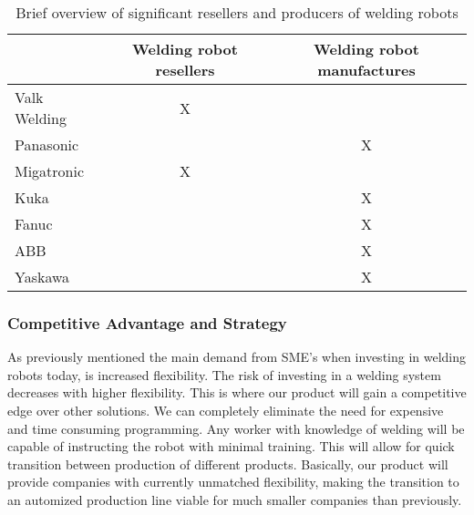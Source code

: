 \begin{table}[h]
\centering
\begin{tabular}{|l|c|c|}
\hline
             & Welding robot resellers & Welding robot manufactures \\ 
\hline
Valk Welding & X                       &  \\ 
\hline
Panasonic    &                         & X \\ 
\hline
Migatronic   & X                       &  \\ 
\hline
Kuka         &                         & X \\ 
\hline                                 
Fanuc        &                         & X \\ 
\hline                                 
ABB          &                         & X \\ 
\hline                                 
Yaskawa      &                         & X \\ 
\hline
\end{tabular} 
\caption{Brief overview of significant resellers and producers of welding robots}
\label{Tablecompetitors}
\end{table}

\subsubsection{Competitive Advantage and Strategy}
As previously mentioned the main demand from SME's when investing in welding robots today, is increased flexibility.
 The risk of investing in a welding system decreases with higher flexibility. This is where our product will gain a competitive edge over other solutions. We can completely eliminate the need for expensive and time consuming programming. Any worker with knowledge of welding will be capable of instructing the robot with minimal training. This will allow for quick transition between production of different products. Basically, our product will provide companies with currently unmatched flexibility, making the transition to an automized production line viable for much smaller companies than previously.